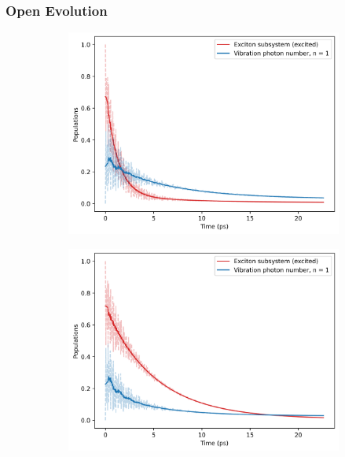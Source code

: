 \documentclass[11pt]{article}
\newcounter{subsubsubsection}[subsubsection]
\begin{document}
\subsubsection{Open Evolution}
\newpage
\begin{figure}[H]
    \centering
    \begin{subfigure}{0.45\textwidth}
        \centering
        \includegraphics[width=\linewidth]{Research Project/Code/results/ExVib/Open/Population/pops_ex_spont_e0.png}
        \caption{}
        \label{fig:EVM_OQS_Pop_spont}
    \end{subfigure}
    \hfill
    \begin{subfigure}{0.45\textwidth}
        \centering
        \includegraphics[width=\linewidth]{Research Project/Code/results/ExVib/Open/Population/pops_ex_therm_e0.png}
        \caption{}
        \label{fig:EVM_OQS_Pop_therm}
    \end{subfigure}
    

\end{figure}
\end{document}
